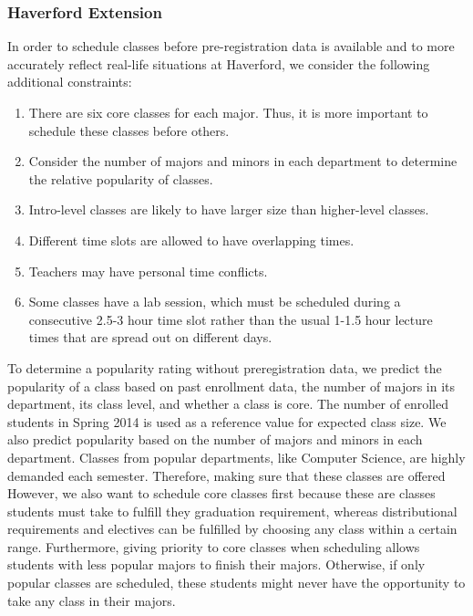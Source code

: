 \documentclass[11pt, oneside]{article}   	%
\begin{document}
\subsubsection{Haverford Extension}
In order to schedule classes before pre-registration data is available and to more accurately reflect real-life situations at Haverford, we consider the following additional constraints:
\begin{enumerate}
\item There are six core classes for each major. Thus, it is more important to schedule these classes before others.
\item Consider the number of majors and minors in each department to determine the relative popularity of classes.
\item Intro-level classes are likely to have larger size than higher-level classes.
\item Different time slots are allowed to have overlapping times.
\item Teachers may have personal time conflicts.
\item Some classes have a lab session, which must be scheduled during a consecutive 2.5-3 hour time slot rather than the usual 1-1.5 hour lecture times that are spread out on different days.
\end{enumerate}
\par To determine a popularity rating without preregistration data, we predict the popularity of a class based on past enrollment data, the number of majors in its department, its class level, and whether a class is core. The number of enrolled students in Spring 2014 is used as a reference value for expected class size. We also predict popularity based on the number of majors and minors in each department. Classes from popular departments, like Computer Science, are highly demanded each semester. Therefore, making sure that these classes are offered However, we also want to schedule core classes first because these are classes students must take to fulfill they graduation requirement, whereas distributional requirements and electives can be fulfilled by choosing any class within a certain range. Furthermore, giving priority to core classes when scheduling allows students with less popular majors to finish their majors. Otherwise, if only popular classes are scheduled, these students might never have the opportunity to take any class in their majors. 
\end{document}
